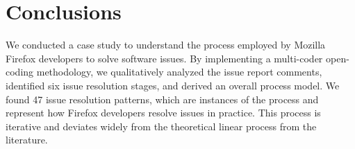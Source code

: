 
\section{Conclusions}
\label{sec:conclusions}
We conducted a case study to understand the process employed by Mozilla Firefox developers to solve software issues. By implementing a multi-coder open-coding methodology, we qualitatively analyzed the issue report comments, identified six issue resolution stages, and derived an overall process model. We found 47 issue resolution patterns, which are instances of the process and represent how Firefox developers resolve issues in practice. This process is iterative and deviates widely from the theoretical linear process from the literature.








